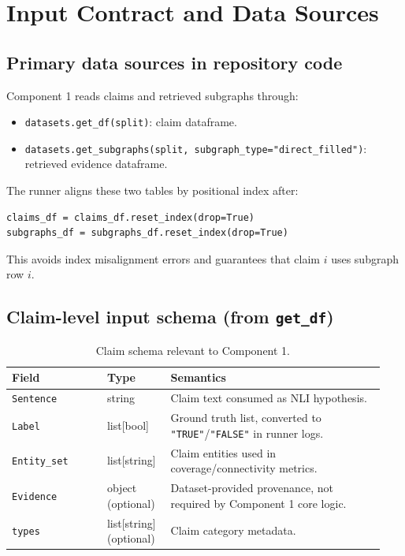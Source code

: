 \section{Input Contract and Data Sources}
\label{sec:c1_inputs}

\subsection{Primary data sources in repository code}
Component 1 reads claims and retrieved subgraphs through:
\begin{itemize}
\item \texttt{datasets.get\_df(split)}: claim dataframe.
\item \texttt{datasets.get\_subgraphs(split, subgraph\_type="direct\_filled")}: retrieved evidence dataframe.
\end{itemize}
The runner aligns these two tables by positional index after:
\begin{lstlisting}[style=jsonstyle]
claims_df = claims_df.reset_index(drop=True)
subgraphs_df = subgraphs_df.reset_index(drop=True)
\end{lstlisting}
This avoids index misalignment errors and guarantees that claim $i$ uses subgraph row $i$.

\subsection{Claim-level input schema (from \texttt{get\_df})}
\begin{table}[H]
\centering
\begin{tabular}{@{}p{0.24\linewidth}p{0.16\linewidth}p{0.54\linewidth}@{}}
\toprule
Field & Type & Semantics \\
\midrule
\texttt{Sentence} & string & Claim text consumed as NLI hypothesis. \\
\texttt{Label} & list[bool] & Ground truth list, converted to \texttt{"TRUE"}/\texttt{"FALSE"} in runner logs. \\
\texttt{Entity\_set} & list[string] & Claim entities used in coverage/connectivity metrics. \\
\texttt{Evidence} & object (optional) & Dataset-provided provenance, not required by Component 1 core logic. \\
\texttt{types} & list[string] (optional) & Claim category metadata. \\
\bottomrule
\end{tabular}
\caption{Claim schema relevant to Component 1.}
\label{tab:c1_claim_schema}
\end{table}

